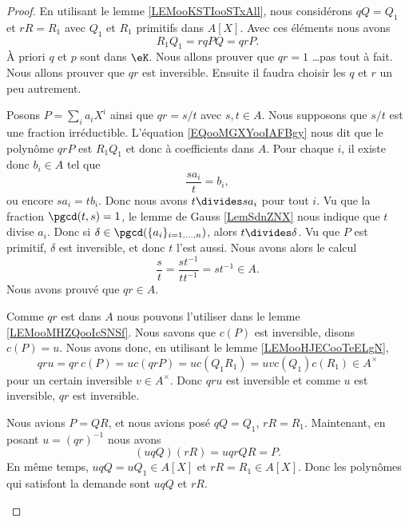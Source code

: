 \begin{proof}
	En utilisant le lemme \ref{LEMooKSTIooSTxAll}, nous considérons \( qQ=Q_1\) et \( rR=R_1\) avec \( Q_1\) et \( R_1\) primitifs dans \( A[X]\). Avec ces éléments nous avons
	\begin{equation}		\label{EQooMGXYooIAFBgy}
		R_1Q_1=rqPQ=qrP.
	\end{equation}
	À priori \( q\) et \( p\) sont dans \( \eK\). Nous allons prouver que \( qr=1\) \ldots pas tout à fait. Nous allons prouver que \( qr\) est inversible. Ensuite il faudra choisir les \( q\) et \( r\) un peu autrement.
	\begin{subproof}
		\spitem[\( qr\in A\)]
		Posons \( P=\sum_ia_iX^i\) ainsi que \( qr=s/t\) avec \( s,t\in A\). Nous supposons que \( s/t\) est une fraction irréductible. L'équation \eqref{EQooMGXYooIAFBgy} nous dit que le polynôme \( qrP\) est \( R_1Q_1\) et donc à coefficients dans \( A\). Pour chaque \( i\), il existe donc \( b_i\in A\) tel que
		\begin{equation}
			\frac{ sa_i }{ t }=b_i,
		\end{equation}
		ou encore \( sa_i=tb_i\). Donc nous avons \( t\divides sa_i\) pour tout \( i\). Vu que la fraction \( \pgcd(t,s)=1\), le lemme de Gauss \ref{LemSdnZNX} nous indique que \( t\) divise \( a_i\). Donc si \( \delta\in \pgcd(\{ a_i \}_{i=1,\ldots,n})\), alors \( t\divides \delta\). Vu que \( P\) est primitif, \( \delta\) est inversible, et donc \( t\) l'est aussi. Nous avons alors le calcul
		\begin{equation}
			\frac{ s }{ t }=\frac{ st^{-1} }{ tt^{-1} }=st^{-1}\in A.
		\end{equation}
		Nous avons prouvé que \( qr\in A\).


		Comme \( qr\) est dans \( A\) nous pouvons l'utiliser dans le lemme \ref{LEMooMHZQooIcSNSf}. Nous savons que \( c(P)\) est inversible, disons \( c(P)=u\). Nous avons donc, en utilisant le lemme \ref{LEMooHJECooTeELgN},
		\begin{equation}
			qru=qr\,c(P)=uc(qrP)=uc(Q_1R_1)=uvc(Q_1)c(R_1)\in A^{\times}
		\end{equation}
		pour un certain inversible \( v\in A^{\times}\). Donc \( qru\) est inversible et comme \( u\) est inversible, \( qr\) est inversible.

		\spitem[Conclusion]

		Nous avions \( P=QR\), et nous avions posé \( qQ=Q_1\), \( rR=R_1\). Maintenant, en posant \( u=(qr)^{-1}\) nous avons
		\begin{equation}
			(uqQ)(rR)=uqrQR=P.
		\end{equation}
		En même temps, \( uqQ=uQ_1\in A[X]\) et \( rR=R_1\in A[X]\). Donc les polynômes qui satisfont la demande sont \( uqQ\) et \( rR\).
	\end{subproof}
\end{proof}

